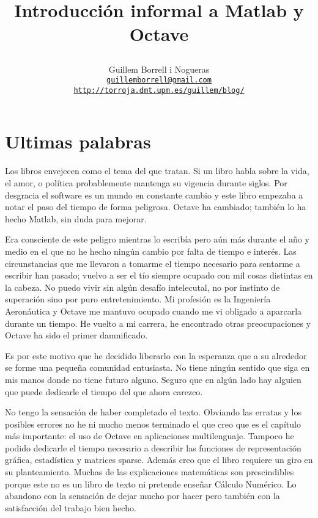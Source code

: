 \documentclass[10pt,fleqn,a4]{book}
\begin{document}
\title{\begin{Huge}Introducción informal a Matlab y Octave\end{Huge}}


\author{Guillem Borrell i Nogueras\\
  \href{mailto:guillemborrell@gmail.com}
  {\texttt{guillemborrell@gmail.com}}\\
  \texttt{\url{http://torroja.dmt.upm.es/guillem/blog/}}\\
}

\maketitle


\chapter*{Ultimas palabras}

Los libros envejecen como el tema del que tratan.  Si un libro habla
sobre la vida, el amor, o política probablemente mantenga su vigencia
durante siglos.  Por desgracia el software es un mundo en constante
cambio y este libro empezaba a notar el paso del tiempo de forma
peligrosa. Octave ha cambiado; también lo ha hecho Matlab, sin duda
para mejorar.

Era consciente de este peligro mientras lo escribía pero aún más
durante el año y medio en el que no he hecho ningún cambio por falta
de tiempo e interés. Las circunstancias que me llevaron a tomarme el
tiempo necesario para sentarme a escribir han pasado; vuelvo a ser el
tío siempre ocupado con mil cosas distintas en la cabeza.  No puedo
vivir sin algún desafío intelecutal, no por instinto de superación
sino por puro entretenimiento. Mi profesión es la Ingeniería
Aeronáutica y Octave me mantuvo ocupado cuando me vi obligado a
aparcarla durante un tiempo.  He vuelto a mi carrera, he encontrado
otras preocupaciones y Octave ha sido el primer damnificado.

Es por este motivo que he decidido liberarlo con la esperanza que a su
alrededor se forme una pequeña comunidad entusiasta.  No tiene
ningún sentido que siga en mis manos donde no tiene futuro
alguno. Seguro que en algún lado hay alguien que puede dedicarle el
tiempo del que ahora carezco.

No tengo la sensación de haber completado el texto.  Obviando las
erratas y los posibles errores no he ni mucho menos terminado el que
creo que es el capítulo más importante: el uso de Octave en
aplicaciones multilenguaje.  Tampoco he podido dedicarle el tiempo
necesario a describir las funciones de representación gráfica,
estadística y matrices sparse. Además creo que el libro requiere un
giro en su planteamiento. Muchas de las explicaciones matemáticas son
prescindibles porque este no es un libro de texto ni pretende enseñar
Cálculo Numérico. Lo abandono con la sensación de dejar mucho por
hacer pero también con la satisfacción del trabajo bien hecho.
\end{document}
